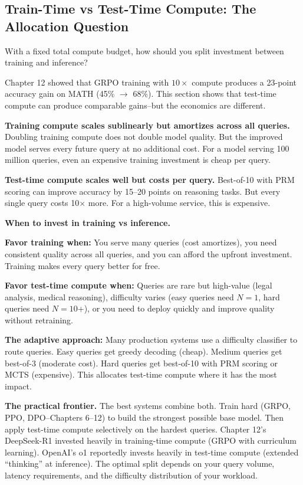 \begin{chapterenv}
\section{Train-Time vs Test-Time Compute: The Allocation Question}


With a fixed total compute budget, how should you split investment between training and inference?

Chapter 12 showed that GRPO training with $10\times$ compute produces a 23-point accuracy gain on MATH (45\% $\to$ 68\%). This section shows that test-time compute can produce comparable gains--but the economics are different.

\textbf{Training compute scales sublinearly but amortizes across all queries.} Doubling training compute does not double model quality. But the improved model serves every future query at no additional cost. For a model serving 100 million queries, even an expensive training investment is cheap per query.

\textbf{Test-time compute scales well but costs per query.} Best-of-10 with PRM scoring can improve accuracy by 15--20 points on reasoning tasks. But every single query costs 10$\times$ more. For a high-volume service, this is expensive.

\begin{infobox}
\textbf{When to invest in training vs inference.}

\textbf{Favor training when:} You serve many queries (cost amortizes), you need consistent quality across all queries, and you can afford the upfront investment. Training makes every query better for free.

\textbf{Favor test-time compute when:} Queries are rare but high-value (legal analysis, medical reasoning), difficulty varies (easy queries need $N=1$, hard queries need $N=10$+), or you need to deploy quickly and improve quality without retraining.

\textbf{The adaptive approach:} Many production systems use a difficulty classifier to route queries. Easy queries get greedy decoding (cheap). Medium queries get best-of-3 (moderate cost). Hard queries get best-of-10 with PRM scoring or MCTS (expensive). This allocates test-time compute where it has the most impact.
\end{infobox}

\begin{tipbox}
\textbf{The practical frontier.} The best systems combine both. Train hard (GRPO, PPO, DPO--Chapters 6--12) to build the strongest possible base model. Then apply test-time compute selectively on the hardest queries. Chapter 12's DeepSeek-R1 invested heavily in training-time compute (GRPO with curriculum learning). OpenAI's o1 reportedly invests heavily in test-time compute (extended ``thinking'' at inference). The optimal split depends on your query volume, latency requirements, and the difficulty distribution of your workload.


\end{tipbox}
\end{chapterenv}
